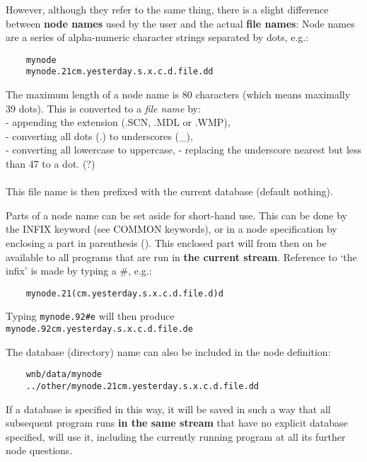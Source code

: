 	However, although they refer to the same thing, there is a slight
difference between {\bf node names} used by the user and the actual {\bf file
names}: Node names are a series of alpha-numeric character strings separated by
dots, e.g.: 

\begin{verbatim} 
    mynode 
    mynode.21cm.yesterday.s.x.c.d.file.dd 
\end{verbatim} 

The maximum length of a node name is 80 characters (which means maximally 39
dots). This is converted to a {\em file name} by: 
\\
- appending the extension (.SCN, .MDL or .WMP), \\ 
- converting all dots (.) to underscores (\_), \\ 
- converting all lowercase to uppercase, 
- replacing the underscore nearest but less than 47 to a dot. (?) \\ 
\\
This file name is then prefixed with the current database (default nothing). 

	Parts of a node name can be set aside for short-hand use.  This can be
done by the INFIX keyword (see COMMON keywords), or in a node specification by
enclosing a part in parenthesis ().  This enclosed part will from then on be
available to all programs that are run in {\bf the current stream}.  Reference
to `the infix' is made by typing a \#, e.g.: 

\begin{verbatim} 
    mynode.21(cm.yesterday.s.x.c.d.file.d)d 
\end{verbatim} 

Typing {\tt mynode.92\#e} will then produce {\tt
mynode.92cm.yesterday.s.x.c.d.file.de} 

The database (directory) name can also be included in the node definition: 

\begin{verbatim} 
    wnb/data/mynode 
    ../other/mynode.21cm.yesterday.s.x.c.d.file.dd 
\end{verbatim} 

	If a database is specified in this way, it will be saved in such a way
that all subsequent program runs {\bf in the same stream} that have no explicit
database specified, will use it, including the currently running program at all
its further node questions. 




